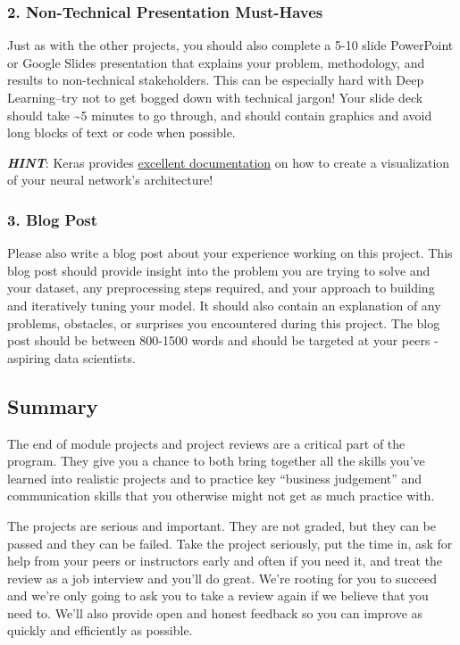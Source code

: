 \documentclass[11pt]{article}
\begin{document}
\hypertarget{non-technical-presentation-must-haves}{%
\subsubsection{2. Non-Technical Presentation
Must-Haves}\label{non-technical-presentation-must-haves}}

Just as with the other projects, you should also complete a 5-10 slide
PowerPoint or Google Slides presentation that explains your problem,
methodology, and results to non-technical stakeholders. This can be
especially hard with Deep Learning--try not to get bogged down with
technical jargon! Your slide deck should take \textasciitilde{}5 minutes
to go through, and should contain graphics and avoid long blocks of text
or code when possible.

\textbf{\emph{HINT}}: Keras provides
\href{https://keras.io/visualization/}{excellent documentation} on how
to create a visualization of your neural network's architecture!

\hypertarget{blog-post}{%
\subsubsection{3. Blog Post}\label{blog-post}}

Please also write a blog post about your experience working on this
project. This blog post should provide insight into the problem you are
trying to solve and your dataset, any preprocessing steps required, and
your approach to building and iteratively tuning your model. It should
also contain an explanation of any problems, obstacles, or surprises you
encountered during this project. The blog post should be between
800-1500 words and should be targeted at your peers - aspiring data
scientists.

    \hypertarget{summary}{%
\subsection{Summary}\label{summary}}

The end of module projects and project reviews are a critical part of
the program. They give you a chance to both bring together all the
skills you've learned into realistic projects and to practice key
``business judgement'' and communication skills that you otherwise might
not get as much practice with.

The projects are serious and important. They are not graded, but they
can be passed and they can be failed. Take the project seriously, put
the time in, ask for help from your peers or instructors early and often
if you need it, and treat the review as a job interview and you'll do
great. We're rooting for you to succeed and we're only going to ask you
to take a review again if we believe that you need to. We'll also
provide open and honest feedback so you can improve as quickly and
efficiently as possible.
\end{document}
